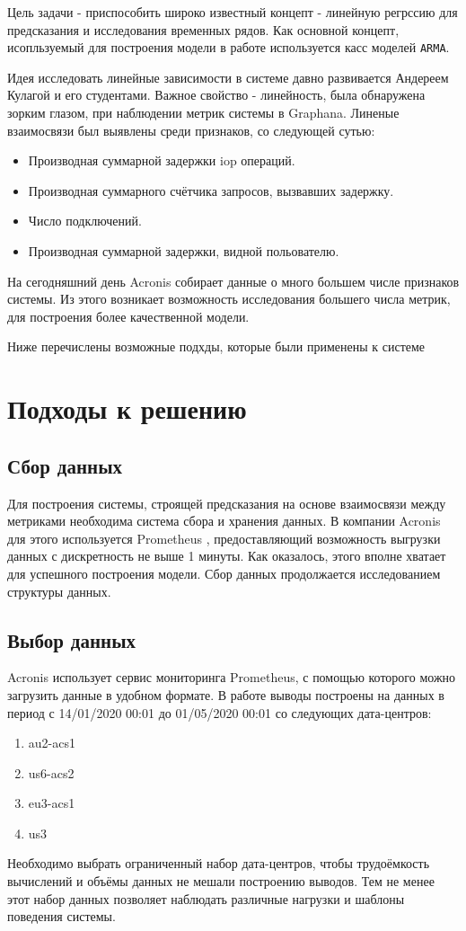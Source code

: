 \documentclass[14pt, a4paper]{extarticle}
\begin{document}
	Цель задачи - приспособить широко известный концепт - линейную регрссию для предсказания и исследования временных рядов.
	Как основной концепт, исопльзуемый для построения модели в работе используется касс моделей \texttt{ARMA}.
	
	Идея исследовать линейные зависимости в системе давно развивается Андереем Кулагой и его студентами.
	Важное свойство - линейность, была обнаружена зорким глазом, при наблюдении метрик системы в Graphana. 
	Линеные взаимосвязи был выявлены среди признаков, со следующей сутью:
	\begin{itemize}
	\item Производная суммарной задержки iop операций.
	\item Производная суммарного счётчика запросов, вызвавших задержку.
	\item Число подключений.
	\item Производная суммарной задержки, видной польователю.
	\end{itemize}
	
	На сегодняшний день Acronis собирает данные о много большем числе признаков системы.
	Из этого возникает возможность исследования большего числа метрик, для построения более качественной модели.
	
	Ниже перечислены возможные подхды, которые были применены к системе
	
	
	\section{Подходы к решению}
	\subsection{Сбор данных}
	Для построения системы, строящей предсказания на основе взаимосвязи между метриками необходима система сбора и хранения данных. 
	В компании Acronis для этого используется Prometheus \cite{lib_prometheus}, предоставляющий возможность выгрузки данных с дискретность не выше 1 минуты.
	 Как оказалось, этого вполне хватает для успешного построения модели.
	Сбор данных продолжается исследованием структуры данных.
	
			
	\subsection{Выбор данных}
	Acronis использует сервис мониторинга Prometheus, с помощью которого можно загрузить данные в удобном формате. 
	В работе выводы построены на данных в период с 14/01/2020 00:01 до 01/05/2020 00:01 со следующих дата-центров:
	\begin{enumerate}
		\item au2-acs1
		\item us6-acs2
		\item eu3-acs1
		\item us3
	\end{enumerate}
	Необходимо выбрать ограниченный набор дата-центров, чтобы трудоёмкость вычислений и объёмы данных не мешали построению выводов. 
	Тем не менее этот набор данных позволяет наблюдать различные нагрузки и шаблоны поведения системы.
	
\end{document}
